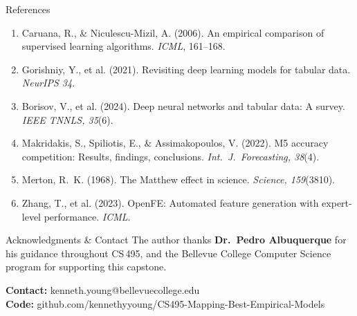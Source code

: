 \documentclass[a0,portrait]{a0poster}
\begin{document}
\vfill
\noindent
\begin{minipage}[t]{0.635\textwidth}
\begin{posterblock}{References}
\small
\begin{enumerate}[leftmargin=1.6em,itemsep=2pt,topsep=2pt]
  \item Caruana, R., \& Niculescu-Mizil, A. (2006). An empirical comparison of supervised learning algorithms. \textit{ICML}, 161--168.
  \item Gorishniy, Y., et al. (2021). Revisiting deep learning models for tabular data. \textit{NeurIPS 34}.
  \item Borisov, V., et al. (2024). Deep neural networks and tabular data: A survey. \textit{IEEE TNNLS, 35}(6).
  \item Makridakis, S., Spiliotis, E., \& Assimakopoulos, V. (2022). M5 accuracy competition: Results, findings, conclusions. \textit{Int.\ J.\ Forecasting, 38}(4).
  \item Merton, R.~K. (1968). The Matthew effect in science. \textit{Science, 159}(3810).
  \item Zhang, T., et al. (2023). OpenFE: Automated feature generation with expert-level performance. \textit{ICML}.
\end{enumerate}
\end{posterblock}
\end{minipage}
\hfill
\begin{minipage}[t]{0.345\textwidth}
\begin{posterblock}{Acknowledgments \& Contact}
The author thanks \textbf{Dr.~Pedro Albuquerque} for his guidance throughout CS\,495, and the
Bellevue College Computer Science program for supporting this capstone.

\vspace{0.4em}
\textbf{Contact:} kenneth.young@bellevuecollege.edu\\
\textbf{Code:} github.com/kennethyyoung/CS495-Mapping-Best-Empirical-Models
\end{posterblock}
\end{minipage}

\vspace{0.6em}
\noindent{}
\end{document}
